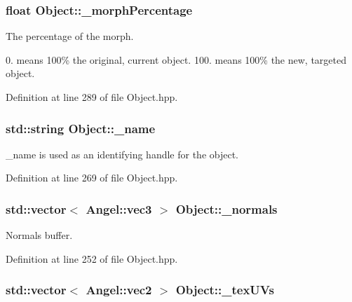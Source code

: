 \hypertarget{class_object_a7fbbac9027e1a8266342bd5ce064120d}{
\subsubsection[{\-\_\-morph\-Percentage}]{\setlength{\rightskip}{0pt plus 5cm}float Object\-::\-\_\-morph\-Percentage\hspace{0.3cm}{\ttfamily [protected]}}}\label{class_object_a7fbbac9027e1a8266342bd5ce064120d}


The percentage of the morph. 

0. means 100\% the original, current object. 100. means 100\% the new, targeted object. 

Definition at line 289 of file Object.\-hpp.

\hypertarget{class_object_a3f617214b260ebbe394e7c7b08ab5e43}{
\subsubsection[{\-\_\-name}]{\setlength{\rightskip}{0pt plus 5cm}std\-::string Object\-::\-\_\-name\hspace{0.3cm}{\ttfamily [protected]}}}\label{class_object_a3f617214b260ebbe394e7c7b08ab5e43}


\-\_\-name is used as an identifying handle for the object. 



Definition at line 269 of file Object.\-hpp.

\hypertarget{class_object_a20bb786cb5915934853855aab9d1a1b3}{
\subsubsection[{\-\_\-normals}]{\setlength{\rightskip}{0pt plus 5cm}std\-::vector$<$ {\bf Angel\-::vec3} $>$ Object\-::\-\_\-normals}}\label{class_object_a20bb786cb5915934853855aab9d1a1b3}


Normals buffer. 



Definition at line 252 of file Object.\-hpp.

\hypertarget{class_object_aa9ddc3b95d74b76ab8a251fb376dfafb}{
\subsubsection[{\-\_\-tex\-U\-Vs}]{\setlength{\rightskip}{0pt plus 5cm}std\-::vector$<$ {\bf Angel\-::vec2} $>$ Object\-::\-\_\-tex\-U\-Vs}}\label{class_object_aa9ddc3b95d74b76ab8a251fb376dfafb}


